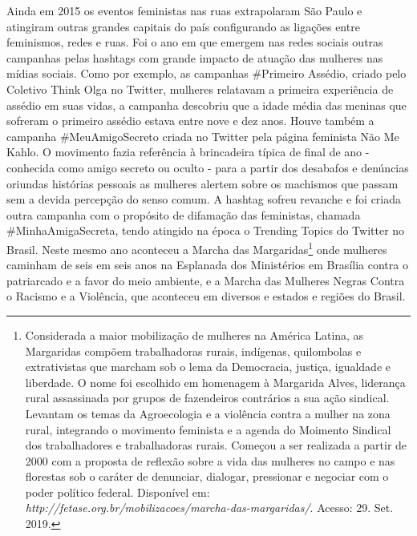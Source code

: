 Ainda em 2015 os eventos feministas nas ruas extrapolaram São Paulo e
atingiram outras grandes capitais do país configurando as ligações entre
feminismos, redes e ruas. Foi o ano em que emergem nas redes sociais
outras campanhas pelas hashtags com grande impacto de atuação das
mulheres nas mídias sociais. Como por exemplo, as campanhas \#Primeiro
Assédio, criado pelo Coletivo Think Olga no Twitter, mulheres relatavam
a primeira experiência de assédio em suas vidas, a campanha descobriu
que a idade média das meninas que sofreram o primeiro assédio estava
entre nove e dez anos. Houve também a campanha \#MeuAmigoSecreto criada
no Twitter pela página feminista Não Me Kahlo. O movimento fazia
referência à brincadeira típica de final de ano - conhecida como amigo
secreto ou oculto - para a partir dos desabafos e denúncias oriundas
histórias pessoais as mulheres alertem sobre os machismos que passam sem
a devida percepção do senso comum. A hashtag sofreu revanche e foi
criada outra campanha com o propósito de difamação das feministas,
chamada \#MinhaAmigaSecreta, tendo atingido na época o Trending Topics
do Twitter no Brasil. Neste mesmo ano aconteceu a Marcha das
Margaridas\footnote{Considerada a maior mobilização de mulheres na
  América Latina, as Margaridas compõem trabalhadoras rurais, indígenas,
  quilombolas e extrativistas que marcham sob o lema da Democracia,
  justiça, igualdade e liberdade. O nome foi escolhido em homenagem à
  Margarida Alves, liderança rural assassinada por grupos de fazendeiros
  contrários a sua ação sindical. Levantam os temas da Agroecologia e a
  violência contra a mulher na zona rural, integrando o movimento
  feminista e a agenda do Moimento Sindical dos trabalhadores e
  trabalhadoras rurais. Começou a ser realizada a partir de 2000 com a
  proposta de reflexão sobre a vida das mulheres no campo e nas
  florestas sob o caráter de denunciar, dialogar, pressionar e negociar
  com o poder político federal. Disponível em:
  \emph{http://fetase.org.br/mobilizacoes/marcha-das-margaridas/}.
  Acesso: 29. Set. 2019.} onde mulheres caminham de seis em seis anos na
Esplanada dos Ministérios em Brasília contra o patriarcado e a favor do
meio ambiente, e a Marcha das Mulheres Negras Contra o Racismo e a
Violência, que aconteceu em diversos e estados e regiões do Brasil.

